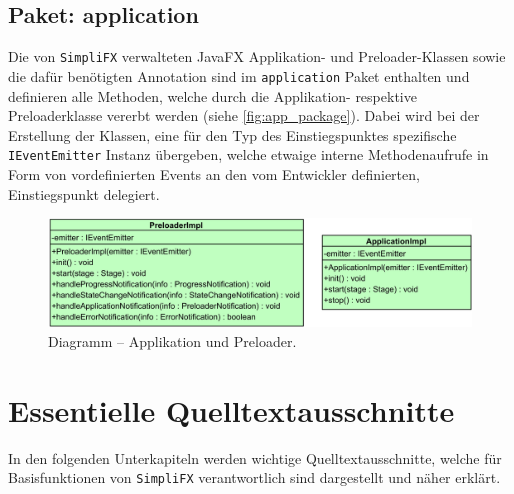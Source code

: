 \subsection{Paket: application}
Die von \texttt{SimpliFX} verwalteten JavaFX Applikation- und Preloader-Klassen sowie die dafür benötigten Annotation sind im \texttt{application} Paket enthalten und definieren alle Methoden, welche durch die Applikation- respektive Preloaderklasse vererbt werden (siehe \autoref{fig:app_package}). Dabei wird bei der Erstellung der Klassen, eine für den Typ des Einstiegspunktes spezifische \texttt{IEventEmitter} Instanz übergeben, welche etwaige interne Methodenaufrufe in Form von vordefinierten Events an den vom Entwickler definierten, Einstiegspunkt delegiert.
\begin{figure}[H]
	\centering
	\includegraphics[width=\textwidth-2cm]{Abbildungen/Applikation und Preloader.png}
	\caption{Diagramm -- Applikation und Preloader.}
	\label{fig:app_package}
\end{figure}
\section{Essentielle Quelltextausschnitte}
In den folgenden Unterkapiteln werden wichtige Quelltextausschnitte, welche für Basisfunktionen von \texttt{SimpliFX} verantwortlich sind dargestellt und näher erklärt.
